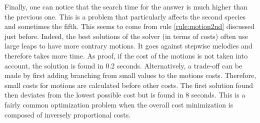 Finally, one can notice that the search time for the answer is much higher than the previous one. This is a problem that particularly affects the second species and sometimes the fifth. This seems to come from rule \ref{rule:motion2nd} discussed just before. Indeed, the best solutions of the solver (in terms of costs) often use large leaps to have more contrary motions. It goes against stepwise melodies and therefore takes more time. As proof, if the cost of the motions is not taken into account, the solution is found in 0.2 seconds. Alternatively, a trade-off can be made by first adding branching from small values to the motions costs. Therefore, small costs for motions are calculated before other costs. The first solution found then deviates from the lowest possible cost but is found in 8 seconds. This is a fairly common optimization problem when the overall cost minimization is composed of inversely proportional costs.

